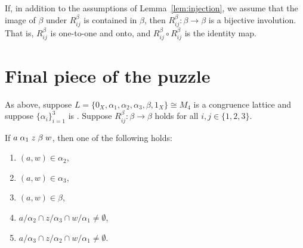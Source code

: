 If, in addition to the assumptions  of Lemma~\ref{lem:injection}, we assume that
the image of $\beta$ under $R_{ij}^\beta$ is contained in $\beta$, then 
$R_{ij}^\beta: \beta \rightarrow \beta$ is a bijective involution.
That is, $R_{ij}^\beta$ is one-to-one and onto, and 
$R_{ij}^\beta\circ R_{ij}^\beta$ is the identity map.


\section{Final piece of the puzzle}
As above, suppose $L = \{0_X, \alpha_1, \alpha_2, \alpha_3, \beta, 1_X\} \cong  M_4$ is a
congruence lattice and suppose $\{\alpha_i\}_{i=1}^3$  is \pppc.
Suppose $R_{ij}^\beta: \beta \rightarrow \beta$ holds for all 
$i, j \in \{1,2,3\}$.

\begin{lemma}
  \label{lem:missingpiece}
If %
$a \mathrel{\alpha}_1 z \mathrel{\beta} w$,
then one of the following holds:
\begin{enumerate}
\item $(a,w) \in \alpha_2$, 
\item $(a,w) \in \alpha_3$, 
\item $(a,w) \in \beta$, 
\item $a/\alpha_2 \cap z/\alpha_3 \cap w/\alpha_1 \neq \emptyset$,
\item $a/\alpha_3 \cap z/\alpha_2 \cap w/\alpha_1 \neq \emptyset$.
\end{enumerate}
\end{lemma}


